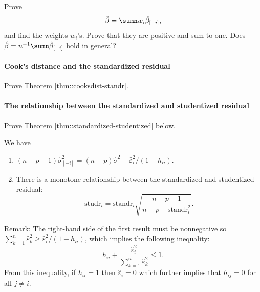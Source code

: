 Prove 
\[
\hat{\beta}=\sumn w_{i}\hat{\beta}_{[-i]},
\]
and find the weights $w_{i}$'s. Prove that they are positive and sum to
one. Does $\hat{\beta}=n^{-1}\sumn\hat{\beta}_{[-i]}$ hold in general?

\paragraph{Cook's distance and the standardized residual}\label{hw10::cooks-standr}

Prove Theorem \ref{thm::cooksdist-standr}. 


\paragraph{The relationship between the standardized and studentized residual}\label{hw10::residuals-relationship}

Prove Theorem \ref{thm::standardized-studentized} below. 

\begin{theorem}\label{thm::standardized-studentized}
We have 
\begin{enumerate}
\item $(n-p-1)\hat{\sigma}_{[-i]}^{2}=(n-p)\hat{\sigma}^{2}-\hat{\varepsilon}_{i}^{2}/(1-h_{ii})$. 

 


\item There is a monotone relationship between the standardized and studentized
residual:
\[
\text{studr}_{i}=\text{standr}_{i}\sqrt{\frac{n-p-1}{n-p-\text{standr}_{i}^{2}}}.
\]
\end{enumerate}
\end{theorem}

Remark: The right-hand side of the first result must be nonnegative so  $\sum_{k=1}^n   \hat{\varepsilon}_k^2 \geq \hat{\varepsilon}_{i}^{2}/(1-h_{ii})$, which 
implies the following inequality:
$$
h_{ii}  + \frac{  \hat{\varepsilon}_i^2 }{ \sum_{k=1}^n   \hat{\varepsilon}_k^2 } \leq 1.
$$
From this inequality, if $h_{ii} = 1$ then $\hat{\varepsilon}_i = 0$ which further implies that $h_{ij} = 0$ for all $j \neq i.$
 


 




